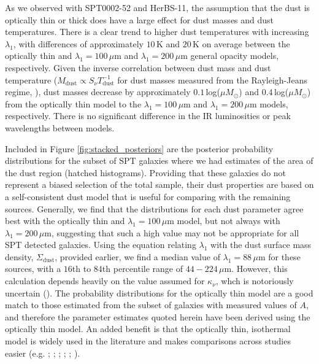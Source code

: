 As we observed with SPT0002-52 and HerBS-11, the assumption that the dust is optically thin or thick does have a large effect for dust masses and dust temperatures. There is a clear trend to higher dust temperatures with increasing $\lambda_1$, with differences of approximately $10\,$K and $20\,$K on average between the optically thin and $\lambda_1 = 100\,\mu$m and $\lambda_1 = 200\,\mu$m general opacity models, respectively. Given the inverse correlation between dust mass and dust temperature ($M_\textrm{dust} \propto S_\nu T_\textrm{dust}^{-1}$ for dust masses measured from the Rayleigh-Jeans regime, \citealt{Casey_2014b}), dust masses decrease by approximately $0.1\,$log($\mu M_\odot$) and $0.4\,$log($\mu M_\odot$) from the optically thin model to the $\lambda_1 = 100\,\mu$m and $\lambda_1 = 200\,\mu$m models, respectively. There is no significant difference in the IR luminosities or peak wavelengths between models.

Included in Figure \ref{fig:stacked_posteriors} are the posterior probability distributions for the subset of SPT galaxies where we had estimates of the area of the dust region (hatched histograms). Providing that these galaxies do not represent a biased selection of the total sample, their dust properties are based on a self-consistent dust model that is useful for comparing with the remaining sources. Generally, we find that the distributions for each dust parameter agree best with the optically thin and $\lambda_1 = 100\,\mu$m model, but not always with $\lambda_1 = 200\,\mu$m, suggesting that such a high value may not be appropriate for all SPT detected galaxies. Using the equation relating $\lambda_1$ with the dust surface mass density, $\Sigma_\textrm{dust}$, provided earlier, we find a median value of $\lambda_1 = 88\,\mu$m for these sources, with a $16$th to $84$th percentile range of $44 - 224\,\mu$m. However, this calculation depends heavily on the value assumed for $\kappa_\nu$, whch is notoriously uncertain (\citealt{Clark_2016}). The probability distributions for the optically thin model are a good match to those estimated from the subset of galaxies with measured values of $A$, and therefore the parameter estimates quoted herein have been derived using the optically thin model. An added benefit is that the optically thin, isothermal model is widely used in the literature and makes comparisons across studies easier (e.g. \citealt{Magdis_2012}; \citealt{Simpson_2017}; \citealt{Lamperti_2019}; \citealt{Dudzeviciute_2020}; \citealt{Valentino_2020a}; \citealt{daCunha_2021}).

